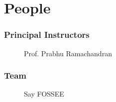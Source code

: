 \documentclass[compress,red]{beamer} %
\begin{document}
\section{People}
\begin{frame}
\frametitle{Principal Instructors}
\begin{figure}[ht] 
\begin{minipage}[b]{0.5\linewidth}
{ \caption{Prof. Prabhu Ramachandran} \par}
\end{minipage}
\begin{minipage}[b]{0.5\linewidth}
\end{minipage}
\end{figure} 
\end{frame}

\begin{frame}
\frametitle{Team}
\begin{figure}[ht]
{ \caption{Say FOSSEE}}
\end{figure}
\end{frame}

\section*{}
\end{document}

